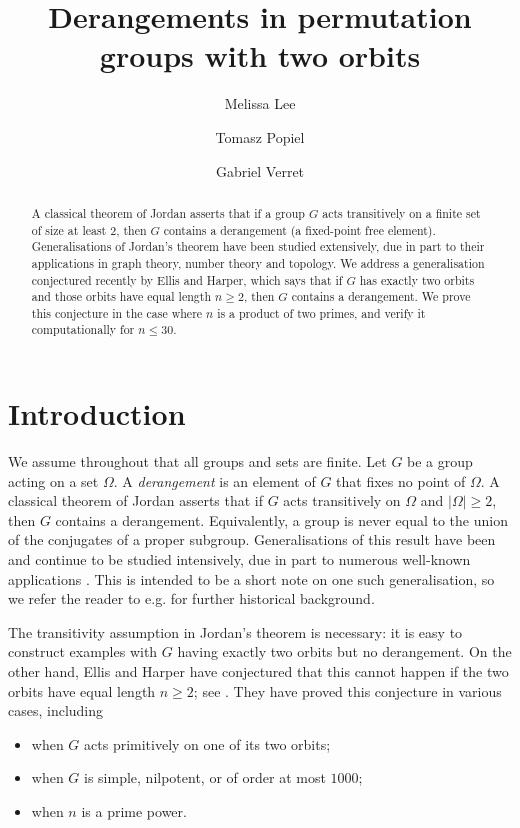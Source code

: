 \documentclass[11pt,a4paper]{amsart}
\title{Derangements in permutation groups  with two orbits}
\author{Melissa Lee}
\author{Tomasz Popiel}
\author{Gabriel Verret}
\theoremstyle{definition}
\begin{document}
\begin{abstract}
A classical theorem of Jordan asserts that if a group $G$ acts transitively on a finite set of size at least $2$, then $G$ contains a derangement (a fixed-point free element). Generalisations of Jordan's theorem have been studied extensively, due in part to their applications in graph theory, number theory and topology. We address a generalisation conjectured recently by Ellis and Harper, which says that if $G$ has exactly two orbits and those orbits have equal length $n \geq 2$, then $G$ contains a derangement. We prove this conjecture in the case where $n$ is a product of two primes, and verify it computationally for $n \leq 30$.
\end{abstract}

\maketitle

\section{Introduction}
We assume throughout  that all  groups and sets are finite. Let $G$ be a group acting on a set $\Omega$. A {\em derangement} is an element of $G$ that fixes no point of $\Omega$. A classical theorem of Jordan \cite{Jordan1872} asserts that if $G$ acts transitively on $\Omega$ and $|\Omega|\geq 2$, then $G$ contains a derangement. Equivalently, a group is never equal to the union of the conjugates of a proper subgroup. Generalisations of this result have been and continue to be studied intensively, due in part to numerous well-known applications \cite{serre}. This is intended to be a short note on one such generalisation, so we refer the reader to e.g. \cite[Chapter~1]{BG} for further historical background. 

The transitivity assumption in Jordan's theorem is necessary: it is easy to construct examples with $G$ having exactly two orbits but no derangement. On the other hand, Ellis and Harper have conjectured  that this cannot happen if the two orbits have equal length $n \geq 2$; see \cite[Conjecture~2]{harper_ellis}. They have proved this conjecture in various cases, including 
\begin{itemize} 
    \item[(i)] when $G$ acts primitively on one of its two orbits;
    \item[(ii)] when $G$ is simple, nilpotent, or of order at most $1000$;
    \item[(iii)] when $n$ is a prime power.
\end{itemize}
\end{document}

